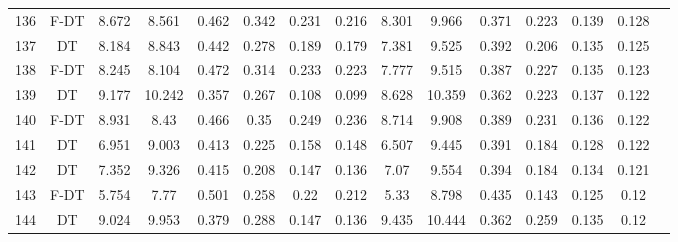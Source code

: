\begin{longtable}{@{\hskip3pt}c@{\hskip3pt}c@{\hskip3pt}c@{\hskip3pt}c@{\hskip3pt}c@{\hskip3pt}c@{\hskip3pt}c@{\hskip3pt}c@{\hskip3pt}c@{\hskip3pt}c@{\hskip3pt}c@{\hskip3pt}c@{\hskip3pt}c@{\hskip3pt}c@{\hskip3pt}c}
        136 &           F-DT &             8.672 &          8.561 &           0.462 &           0.342 &           0.231 &           0.216 &               8.301 &           9.966 &           0.371 &         0.223 &          0.139 &           0.128 \\
        137 &             DT &             8.184 &          8.843 &           0.442 &           0.278 &           0.189 &           0.179 &               7.381 &           9.525 &           0.392 &         0.206 &          0.135 &           0.125 \\
        138 &           F-DT &             8.245 &          8.104 &           0.472 &           0.314 &           0.233 &           0.223 &               7.777 &           9.515 &           0.387 &         0.227 &          0.135 &           0.123 \\
        139 &             DT &             9.177 &         10.242 &           0.357 &           0.267 &           0.108 &           0.099 &               8.628 &          10.359 &           0.362 &         0.223 &          0.137 &           0.122 \\
        140 &           F-DT &             8.931 &           8.43 &           0.466 &            0.35 &           0.249 &           0.236 &               8.714 &           9.908 &           0.389 &         0.231 &          0.136 &           0.122 \\
        141 &             DT &             6.951 &          9.003 &           0.413 &           0.225 &           0.158 &           0.148 &               6.507 &           9.445 &           0.391 &         0.184 &          0.128 &           0.122 \\
        142 &             DT &             7.352 &          9.326 &           0.415 &           0.208 &           0.147 &           0.136 &                7.07 &           9.554 &           0.394 &         0.184 &          0.134 &           0.121 \\
        143 &           F-DT &             5.754 &           7.77 &           0.501 &           0.258 &            0.22 &           0.212 &                5.33 &           8.798 &           0.435 &         0.143 &          0.125 &            0.12 \\
        144 &             DT &             9.024 &          9.953 &           0.379 &           0.288 &           0.147 &           0.136 &               9.435 &          10.444 &           0.362 &         0.259 &          0.135 &            0.12 \\

\end{longtable}
